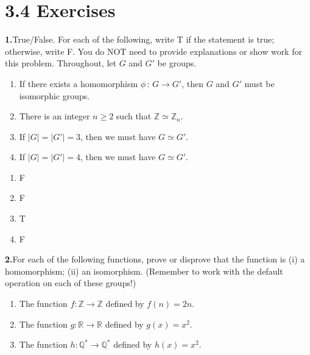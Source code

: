 \documentclass[10pt,]{book}
\theoremstyle{plain}
\theoremstyle{definition}
\theoremstyle{definition}
\theoremstyle{definition}
\theoremstyle{definition}
\numberwithin{equation}{section}
\def\Z{\mathbb{Z}}
\def\R{\mathbb{R}}
\def\Q{\mathbb{Q}}
\begin{document}
\section*{3.4 Exercises}
\noindent\textbf{1.}\quad{}True/False. For each of the following, write T if the statement is true; otherwise, write F. You do NOT need to provide explanations or show work for this problem. Throughout, let \(G\) and \(G'\) be groups. \leavevmode%
\begin{enumerate}[label=(\alph*)]
\item\hypertarget{li-148}{}If there exists a homomorphism \(\phi\,:\,G\to G'\), then \(G\) and \(G'\) must be isomorphic groups.%
\item\hypertarget{li-149}{}There is an integer \(n\geq 2\) such that \(\Z\simeq \Z_n\).%
\item\hypertarget{li-150}{}If \(|G|=|G'|=3\), then we must have \(G\simeq G'\).%
\item\hypertarget{li-151}{}If \(|G|=|G'|=4\), then we must have \(G\simeq G'\).%
\end{enumerate}
%
\par\smallskip
\leavevmode%
\begin{multicols}{4}
\begin{enumerate}[label=(\alph*)]
\item\hypertarget{li-152}{}F%
\item\hypertarget{li-153}{}F%
\item\hypertarget{li-154}{}T%
\item\hypertarget{li-155}{}F%
\end{enumerate}
\end{multicols}
\par\smallskip
\noindent\textbf{2.}\quad{}For each of the following functions, prove or disprove that the function is (i) a homomorphism; (ii) an isomorphism. (Remember to work with the default operation on each of these groups!) \leavevmode%
\begin{enumerate}[label=(\alph*)]
\item\hypertarget{li-156}{}The function \(f:\Z\to\Z\) defined by \(f(n)=2n\).%
\item\hypertarget{li-157}{}The function \(g:\R\to\R\) defined by \(g(x)=x^2\).%
\item\hypertarget{li-158}{}The function \(h:\Q^*\to\Q^*\) defined by \(h(x)=x^2\).%
\end{enumerate}
%
\par\smallskip
\leavevmode%
\end{document}
